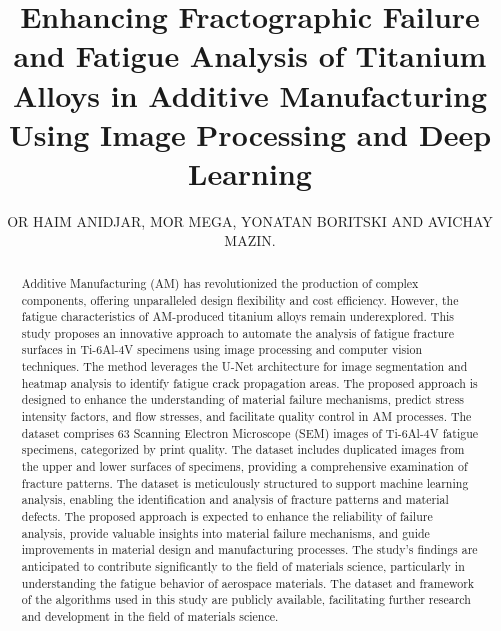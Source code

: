 \documentclass{ieeeaccess}
\begin{document}
\title{Enhancing Fractographic Failure and Fatigue Analysis of Titanium Alloys in Additive Manufacturing Using Image Processing and Deep Learning}


\author{\uppercase{Or Haim Anidjar, Mor Mega, \uppercase{Yonatan Boritski  and Avichay Mazin.}}
\address[1]{School of Computer Science, Ariel University, Israel.}
\address[2]{Kinematics and Computational Geometry Lab (K\&CG), Ariel University, Israel.}
\address[3]{Ariel Cyber Innovation Center (ACIC), Ariel University, Israel.}
\address[4]{Data Science and Artificial Intelligence Research Center, Ariel University, Israel.}
\address[5]{School of Mechanical Engineering and Mechatronics, Ariel University, Golan Heights 1, 4077625, Ariel, Israel.}}



\begin{abstract}
Additive Manufacturing (AM) has revolutionized the production of complex components, offering unparalleled design flexibility and cost efficiency. However, the fatigue characteristics of AM-produced titanium alloys remain underexplored. This study proposes an innovative approach to automate the analysis of fatigue fracture surfaces in Ti-6Al-4V specimens using image processing and computer vision techniques. The method leverages the U-Net architecture for image segmentation and heatmap analysis to identify fatigue crack propagation areas. The proposed approach is designed to enhance the understanding of material failure mechanisms, predict stress intensity factors, and flow stresses, and facilitate quality control in AM processes. The dataset comprises 63 Scanning Electron Microscope (SEM) images of Ti-6Al-4V fatigue specimens, categorized by print quality. The dataset includes duplicated images from the upper and lower surfaces of specimens, providing a comprehensive examination of fracture patterns. The dataset is meticulously structured to support machine learning analysis, enabling the identification and analysis of fracture patterns and material defects. The proposed approach is expected to enhance the reliability of failure analysis, provide valuable insights into material failure mechanisms, and guide improvements in material design and manufacturing processes. The study's findings are anticipated to contribute significantly to the field of materials science, particularly in understanding the fatigue behavior of aerospace materials. The dataset and framework of the algorithms used in this study are publicly available, facilitating further research and development in the field of materials science.
\end{abstract}
\end{document}
